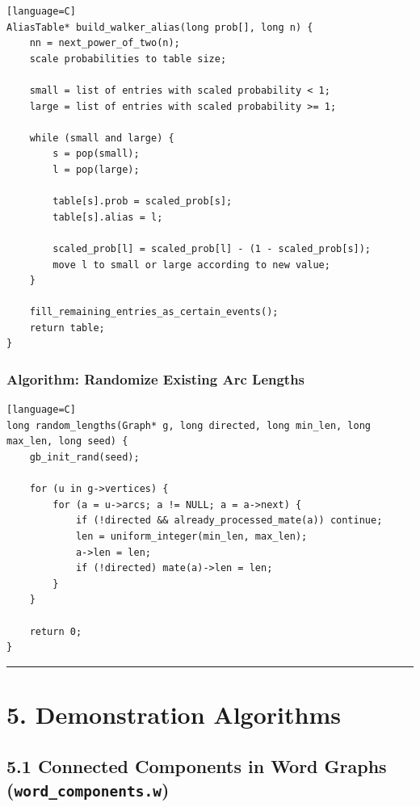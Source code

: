 \documentclass[11pt]{article}
\begin{document}
\begin{verbatim}[language=C]
AliasTable* build_walker_alias(long prob[], long n) {
    nn = next_power_of_two(n);
    scale probabilities to table size;

    small = list of entries with scaled probability < 1;
    large = list of entries with scaled probability >= 1;

    while (small and large) {
        s = pop(small);
        l = pop(large);

        table[s].prob = scaled_prob[s];
        table[s].alias = l;

        scaled_prob[l] = scaled_prob[l] - (1 - scaled_prob[s]);
        move l to small or large according to new value;
    }

    fill_remaining_entries_as_certain_events();
    return table;
}
\end{verbatim}

\subsubsection{Algorithm: Randomize Existing Arc Lengths}\label{algorithm-randomize-existing-arc-lengths}

\begin{verbatim}[language=C]
long random_lengths(Graph* g, long directed, long min_len, long max_len, long seed) {
    gb_init_rand(seed);

    for (u in g->vertices) {
        for (a = u->arcs; a != NULL; a = a->next) {
            if (!directed && already_processed_mate(a)) continue;
            len = uniform_integer(min_len, max_len);
            a->len = len;
            if (!directed) mate(a)->len = len;
        }
    }

    return 0;
}
\end{verbatim}

\begin{center}\rule{0.5\linewidth}{0.5pt}\end{center}

\section{5. Demonstration Algorithms}\label{demonstration-algorithms}

\subsection{\texorpdfstring{5.1 Connected Components in Word Graphs (\texttt{word\_components.w})}{5.1 Connected Components in Word Graphs (word\_components.w)}}\label{connected-components-in-word-graphs-word_components.w}
\end{document}
